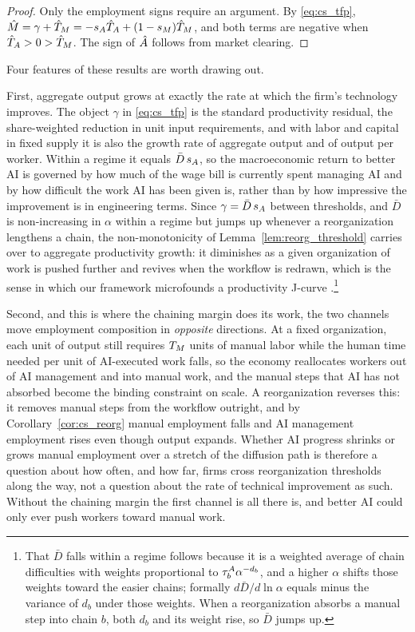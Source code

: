 \begin{proof}
Only the employment signs require an argument.
By \eqref{eq:cs_tfp}, $\hat{M} = \gamma + \hat{T}_{M} = -s_{A}\hat{T}_{A} + (1-s_{M})\hat{T}_{M}$, and both terms are negative when $\hat{T}_{A} > 0 > \hat{T}_{M}$.
The sign of $\hat{A}$ follows from market clearing.
\end{proof}

Four features of these results are worth drawing out.

First, aggregate output grows at exactly the rate at which the firm's technology improves.
The object $\gamma$ in \eqref{eq:cs_tfp} is the standard productivity residual, the share-weighted reduction in unit input requirements, and with labor and capital in fixed supply it is also the growth rate of aggregate output and of output per worker.
Within a regime it equals $\bar{D}\,s_{A}$, so the macroeconomic return to better AI is governed by how much of the wage bill is currently spent managing AI and by how difficult the work AI has been given is, rather than by how impressive the improvement is in engineering terms.
Since $\gamma = \bar{D}\,s_{A}$ between thresholds, and $\bar{D}$ is non-increasing in $\alpha$ within a regime but jumps up whenever a reorganization lengthens a chain, the non-monotonicity of Lemma~\ref{lem:reorg_threshold} carries over to aggregate productivity growth: it diminishes as a given organization of work is pushed further and revives when the workflow is redrawn, which is the sense in which our framework microfounds a productivity J-curve \citep{brynjolfsson2021productivity}.\footnote{
That $\bar{D}$ falls within a regime follows because it is a weighted average of chain difficulties with weights proportional to $\tau^{A}_{b}\alpha^{-d_b}$, and a higher $\alpha$ shifts those weights toward the easier chains; formally $d\bar{D}/d\ln\alpha$ equals minus the variance of $d_b$ under those weights.
When a reorganization absorbs a manual step into chain $b$, both $d_b$ and its weight rise, so $\bar{D}$ jumps up.
}

Second, and this is where the chaining margin does its work, the two channels move employment composition in \emph{opposite} directions.
At a fixed organization, each unit of output still requires $T_{M}$ units of manual labor while the human time needed per unit of AI-executed work falls, so the economy reallocates workers out of AI management and into manual work, and the manual steps that AI has not absorbed become the binding constraint on scale.
A reorganization reverses this: it removes manual steps from the workflow outright, and by Corollary~\ref{cor:cs_reorg} manual employment falls and AI management employment rises even though output expands.
Whether AI progress shrinks or grows manual employment over a stretch of the diffusion path is therefore a question about how often, and how far, firms cross reorganization thresholds along the way, not a question about the rate of technical improvement as such.
Without the chaining margin the first channel is all there is, and better AI could only ever push workers toward manual work.

